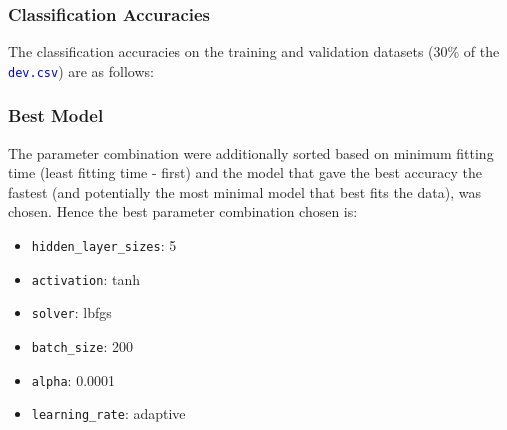 \documentclass[11pt,a4paper]{article}
\def\tt#1{\texttt{#1}}
\def\colortt#1{\textcolor{blue}{\texttt{#1}}}
\begin{document}
\subsubsection{Classification Accuracies}
The classification accuracies on the training and validation datasets (30\% of the \colortt{dev.csv}) are as follows:


\subsubsection{Best Model}
The parameter combination were additionally sorted based on minimum fitting time (least fitting time - first) and the model that gave the best accuracy the fastest (and potentially the most minimal model that best fits the data), was chosen. Hence the best parameter combination chosen is:
\begin{itemize}
    \itemsep0em
    \item \tt{hidden\_layer\_sizes}: 5
    \item \tt{activation}: tanh
    \item \tt{solver}: lbfgs
    \item \tt{batch\_size}: 200
    \item \tt{alpha}: 0.0001
    \item \tt{learning\_rate}: adaptive
\end{itemize}
\end{document}
